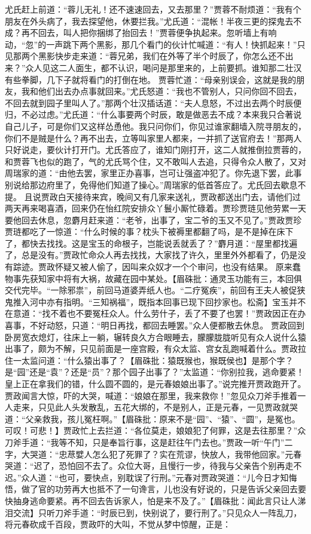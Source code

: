 \documentclass[12pt,oneside]{book}
\begin{document}
尤氏赶上前道：“蓉儿无礼！还不速速回去，又去那里？”贾蓉不耐烦道：“我有个朋友在外头病了，我去探望他，休要拦我。”尤氏道：“混帐！半夜三更的探鬼去不成？再不回去，叫人把你捆绑了抬回去！”贾蓉便争执起来。忽听墙上有响动，“忽”的一声跳下两个黑影，那几个看门的伙计忙喊道：“有人！快抓起来！”只见那两个黑影快步走来道：“蓉兄弟，我们在外等了半个时辰了，你怎么还不出来？”众人见这二人面生，都不认识，喝问是那里来的，上前要抓。谁知那二壮汉有些拳脚，几下子就将看门的打倒在地。
贾蓉忙道：“母亲别误会，这就是我的朋友，我和他们出去办点事就回来。”尤氏怒道：“我也不管别人，只问你回不回去，不回去就到园子里叫人了。”那两个壮汉插话道：“夫人息怒，不过出去两个时辰便归，不必过虑。”尤氏道：“什么事要两个时辰，敢是做恶去不成？本来我只合著说自己儿子，可是你们又这样怂恿他。我只问你们，你见过谁家翻墙入院寻朋友的，你们不是贼是什么？再不出去，立等叫家里人都来，一并抓了送官府去！”那两人只好说走，要伙计打开门。尤氏答应了，谁知门刚打开，这二人就推倒拉贾蓉的，和贾蓉飞也似的跑了，气的尤氏骂个住，又不敢叫人去追，只得令众人散了，又对周瑞家的道：“由他去罢，家里正办喜事，岂可让强盗冲犯了。你先退下罢，此事别说给那边府里了，免得他们知道了操心。”周瑞家的低首答应了。尤氏回去歇息不提。
且说贾政白天接待来宾，晚间又有几家来送礼，贾政都送出门去，请他们过两天再来喝喜酒，回来仍在怡红院安排众丫鬟小厮忙碌着。贾珍贾琏见他劳累一天要他回去休息，忽麝月赶来道：“老爷，出事了，宝二爷的玉又不见了。”贾政贾珍贾琏都吃了一惊道：“什么时候的事？枕头下被褥里都翻了吗，是不是掉在床下了，都快去找找。这是宝玉的命根子，岂能说丢就丢了？”麝月道：“屋里都找遍了，总是没有。”贾政忙命众人再去找找，大家找了许久，里里外外都看了，仍是没有踪迹。贾政怀疑又被人偷了，因叫来众奴才一个个审问，也没有结果。
原来蠢物事先获知家中将有大祸，故藏在园中某处。【眉硃批：通灵玉功能有三，本回俱交代完毕。“一除邪祟”，前回马道婆弄纸人也。“二疗冤疾”，前回有王夫人被促狭鬼推入河中亦有指明。“三知祸福”，既指本回事已现下回抄家也。松斋】宝玉并不在意道：“找不着也不要冤枉众人。什么劳什子，丢了不要了也罢！”贾政因正在办喜事，不好动怒，只道：“明日再找，都回去睡罢。”众人便都散去休息。
贾政回到卧房宽衣熄灯，往床上一躺，辗转良久方合眼睡去，朦朦胧胧听见有众人说什么猿出事了，颇为不解，只见前面是一座宫殿，有众太监、宫女乱跑喊着什么。贾政拉住一太监问道：“什么猿出事了？【眉硃批：猿既猴也，猴既侯也】是那个字？是“园”还是“袁”？还是“员”？那个园子出事了？”太监道：“你别拉我，逃命要紧！皇上正在拿我们的错，什么圆不圆的，是元春娘娘出事了。”说完推开贾政跑开了。贾政闻言大惊，吓的大哭，喊道：“娘娘在那里，我来救你！”忽见众刀斧手推着一人走来，只见此人头发散乱，五花大绑的，不是别人，正是元春，一见贾政就哭道：“父亲救我，孩儿冤枉啊。”【眉硃批：原来不是“园”、“猿”、“圆”，是冤也。可叹！可悲！】贾政忙上去拦道：“各位莫走，娘娘犯了何罪，这是去往那里？”众刀斧手道：“我等不知，只是奉旨行事，这是赶往午门去也。”贾政一听“午门”二字，大哭道：“忠荩嬖人怎么犯了死罪了？实在荒谬，快放人，我带他回家。”元春哭道：“迟了，恐怕回不去了。众位大哥，且慢行一步，待我与父亲告个别再走不迟。”众人道：“也可，要快点，别耽误了行刑。”元春对贾政哭道：“儿今日才知悔悟，做了官的功劳再大也抵不了一句谗言，儿也没有好说的，只是告诉父亲回去要快抽身逃命要紧。再不回去告诉家人，怕是来不及了。”【眉硃批：闻此言只让人涕泪交流】只听刀斧手道：“时辰已到，快别说了，要行刑了。”只见众人一阵乱刀，将元春砍成千百段，贾政吓的大叫，不觉从梦中惊醒，正是：
\end{document}
